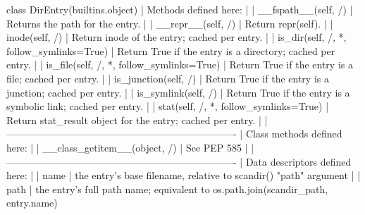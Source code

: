 \documentclass{article}
\begin{document}
    class DirEntry(builtins.object)
     |  Methods defined here:
     |
     |  __fspath__(self, /)
     |      Returns the path for the entry.
     |
     |  __repr__(self, /)
     |      Return repr(self).
     |
     |  inode(self, /)
     |      Return inode of the entry; cached per entry.
     |
     |  is_dir(self, /, *, follow_symlinks=True)
     |      Return True if the entry is a directory; cached per entry.
     |
     |  is_file(self, /, *, follow_symlinks=True)
     |      Return True if the entry is a file; cached per entry.
     |
     |  is_junction(self, /)
     |      Return True if the entry is a junction; cached per entry.
     |
     |  is_symlink(self, /)
     |      Return True if the entry is a symbolic link; cached per entry.
     |
     |  stat(self, /, *, follow_symlinks=True)
     |      Return stat_result object for the entry; cached per entry.
     |
     |  ----------------------------------------------------------------------
     |  Class methods defined here:
     |
     |  __class_getitem__(object, /)
     |      See PEP 585
     |
     |  ----------------------------------------------------------------------
     |  Data descriptors defined here:
     |
     |  name
     |      the entry's base filename, relative to scandir() "path" argument
     |
     |  path
     |      the entry's full path name; equivalent to os.path.join(scandir_path, entry.name)
\end{document}
